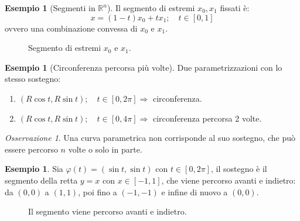 \documentclass[11pt, a4paper, openright]{book}
\theoremstyle{plain}
\theoremstyle{definition}
\newtheorem{esempio}[teorema]{Esempio}
\theoremstyle{remark}
\newtheorem{osservazione}[teorema]{Osservazione}
\begin{document}
\begin{esempio}[Segmenti in $\mathbb{R}^n$]
    Il segmento di estremi $x_0, x_1$ fissati è:
    \begin{equation}
        x = (1 - t)x_0 + tx_1; \quad t \in [0, 1]
    \end{equation}
    ovvero una combinazione convessa di $x_0$ e $x_1$.
\begin{figure}[H]
    \centering
    \caption{Segmento di estremi $x_0$ e $x_1$.}
\end{figure}
\end{esempio}

\begin{esempio}[Circonferenza percorsa più volte]
    Due parametrizzazioni con lo stesso sostegno:
    \begin{enumerate}
        \item $(R\cos t, R\sin t); \quad t \in [0, 2\pi] \Longrightarrow$ circonferenza.
        \item $(R\cos t, R\sin t); \quad t \in [0, 4\pi] \Longrightarrow$ circonferenza percorsa 2 volte.
    \end{enumerate}
\end{esempio}

\begin{osservazione}
    Una curva parametrica non corrisponde al suo sostegno, che può essere percorso $n$ volte o solo in parte.
\end{osservazione}

\begin{esempio}
    Sia $\varphi(t) = (\sin t, \sin t)$ con $t \in [0, 2\pi]$, il sostegno è il segmento della retta $y = x$ con $x \in [-1, 1]$, che viene percorso avanti e indietro: da $(0, 0)$ a $(1, 1)$, poi fino a $(-1, -1)$ e infine di nuovo a $(0, 0)$.
\begin{figure}[H]
    \centering
    \caption{Il segmento viene percorso avanti e indietro.}
\end{figure}
\end{esempio}
\end{document}
